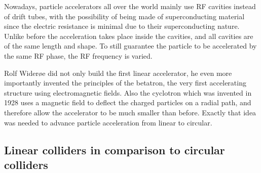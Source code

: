 Nowadays, particle accelerators all over the world mainly use RF cavities instead of drift tubes, with the possibility of being made of superconducting material since the electric resistance is minimal due to their superconducting nature.
Unlike before the acceleration takes place inside the cavities, and all cavities are of the same length and shape.
To still guarantee the particle to be accelerated by the same RF phase, the RF frequency is varied.

Rolf Wider\o e did not only build the first linear accelerator, he even more importantly invented the principles of the betatron, the very first accelerating structure using electromagnetic fields.
Also the cyclotron which was invented in 1928 uses a magnetic field to deflect the charged particles on a radial path, and therefore allow the accelerator to be much smaller than before.
Exactly that idea was needed to advance particle acceleration from linear to circular.

\subsection{Linear colliders in comparison to circular colliders}
\label{Linear-Circular}

